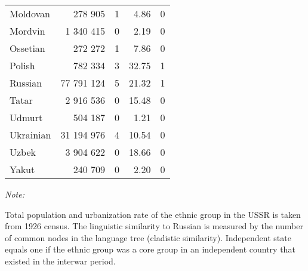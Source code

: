 \begin{table}[!h]
\begin{threeparttable}
\begin{tabular}{lrrrr}
Moldovan & 278 905 & 1 & 4.86 & 0\\
Mordvin & 1 340 415 & 0 & 2.19 & 0\\
Ossetian & 272 272 & 1 & 7.86 & 0\\
Polish & 782 334 & 3 & 32.75 & 1\\
Russian & 77 791 124 & 5 & 21.32 & 1\\
Tatar & 2 916 536 & 0 & 15.48 & 0\\
Udmurt & 504 187 & 0 & 1.21 & 0\\
Ukrainian & 31 194 976 & 4 & 10.54 & 0\\
Uzbek & 3 904 622 & 0 & 18.66 & 0\\
Yakut & 240 709 & 0 & 2.20 & 0\\
\bottomrule
\end{tabular}
\begin{tablenotes}
\item \textit{Note: } 
\item Total population and urbanization rate of the ethnic group in the USSR is taken from 1926 census. The linguistic similarity to Russian is measured by the number of common nodes in the language tree (cladistic similarity). Independent state equals one if the ethnic group was a core group in an independent country that existed in the interwar period.
\end{tablenotes}
\end{threeparttable}
\end{table}